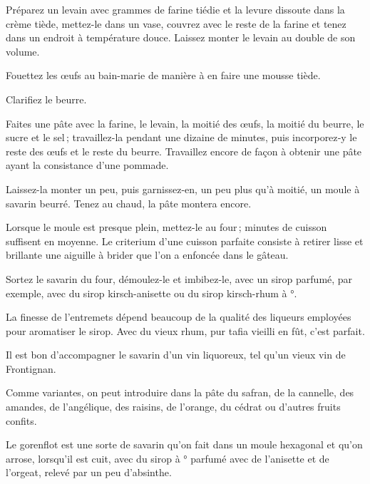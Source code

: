Préparez un levain avec {\mmm} grammes de farine tiédie et la levure
dissoute dans la crème tiède, mettez-le dans un vase, couvrez avec le reste de
la farine et tenez dans un endroit à température douce. Laissez monter le
levain au double de son volume.

Fouettez les œufs au bain-marie de manière à en faire une mousse tiède.

Clarifiez le beurre.

Faites une pâte avec la farine, le levain, la moitié des œufs, la moitié du
beurre, le sucre et le sel ; travaillez-la pendant une dizaine de minutes, puis
incorporez‑y le reste des œufs et le reste du beurre. Travaillez encore de
façon à obtenir une pâte ayant la consistance d’une pommade.

Laissez-la monter un peu, puis garnissez-en, un peu plus qu'à moitié, un moule
à savarin beurré. Tenez au chaud, la pâte montera encore.

Lorsque le moule est presque plein, mettez-le au four ; {\mmm} minutes de
cuisson suffisent en moyenne. Le criterium d’une cuisson parfaite consiste
à retirer lisse et brillante une aiguille à brider que l'on a enfoncée dans le
gâteau.

Sortez le savarin du four, démoulez-le et imbibez-le, avec un sirop parfumé,
par exemple, avec du sirop kirsch-anisette ou du sirop kirsch-rhum
à {\mmm}°.

La finesse de l’entremets dépend beaucoup de la qualité des liqueurs employées
pour aromatiser le sirop. Avec du vieux rhum, pur tafia vieilli en fût, c'est
parfait.

Il est bon d'accompagner le savarin d’un vin liquoreux, tel qu'un vieux vin de
Frontignan.

\sk

Comme variantes, on peut introduire dans la pâte du safran, de la cannelle, des
amandes, de l'angélique, des raisins, de l'orange, du cédrat ou d'autres fruits
confits.

\sk

Le gorenflot est une sorte de savarin qu'on fait dans un moule hexagonal et
qu'on arrose, lorsqu'il est cuit, avec du sirop à {\mmm}° parfumé avec de
l'anisette et de l'orgeat, relevé par un peu d'absinthe.

\sk

